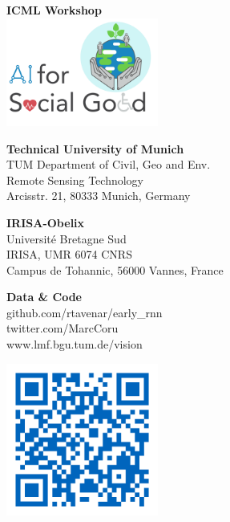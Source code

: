 \documentclass[a0]{tumposter}
\begin{document}
\begin{footer}
	\begin{minipage}{.15\textwidth}
		\textbf{ICML Workshop}\\
		\includegraphics[width=5cm]{images/AI4SG}
	\end{minipage}
	\begin{minipage}{.275\textwidth}
		\textbf{Technical University of Munich}\footnotemark[1]\\
		TUM Department of Civil, Geo and Env. \\
		Remote Sensing Technology \\
		Arcisstr. 21, 80333 Munich, Germany
	\end{minipage}
	\begin{minipage}{.275\textwidth}
		\textbf{IRISA-Obelix}\footnotemark[2]\\
		Université Bretagne Sud \\
		IRISA, UMR 6074 CNRS \\
		Campus de Tohannic, 56000 Vannes, France
		
	\end{minipage}
	\begin{minipage}{.2\textwidth}
		\textbf{Data \& Code} \\
		{github.com/rtavenar/early\_rnn} \\
		{twitter.com/MarcCoru} \\
		www.lmf.bgu.tum.de/vision
	\end{minipage}
	\begin{minipage}{.05\textwidth}
		\hfill\includegraphics[width=5cm]{images/qr-code}\\
		
	\end{minipage}

	
\end{footer}
\end{document}
